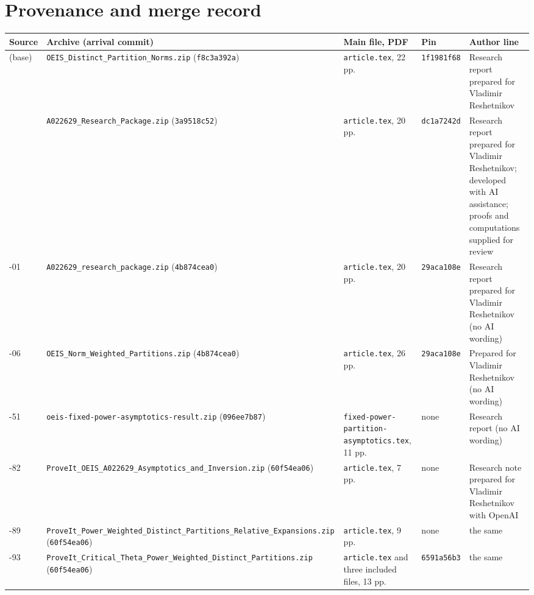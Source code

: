 \documentclass[11pt]{article}
\numberwithin{equation}{section}
\theoremstyle{definition}\newtheorem{definition}[theorem]{Definition}
\theoremstyle{remark}\newtheorem{remark}[theorem]{Remark}
\newcommand{\file}[1]{\nolinkurl{#1}}
\begin{document}
\section{Provenance and merge record}\label{dpn:app:prov}
\begin{center}
\small
\begin{tabular}{>{\raggedright\arraybackslash}p{1.2cm}>{\raggedright\arraybackslash}p{4.0cm}>{\raggedright\arraybackslash}p{2.8cm}>{\raggedright\arraybackslash}p{1.8cm}>{\raggedright\arraybackslash}p{3.2cm}}
\toprule
Source & Archive (arrival commit) & Main file, PDF & Pin & Author line\\
\midrule
40 (base) & \file{OEIS_Distinct_Partition_Norms.zip} (\texttt{f8c3a392a}) &
  \file{article.tex}, 22 pp. & \texttt{1f1981f68} & Research report prepared
  for Vladimir Reshetnikov\\
48 & \file{A022629_Research_Package.zip} (\texttt{3a9518c52}) &
  \file{article.tex}, 20 pp. & \texttt{dc1a7242d} & Research report prepared
  for Vladimir Reshetnikov; developed with AI assistance; proofs and
  computations supplied for review\\
75-01 & \file{A022629_research_package.zip} (\texttt{4b874cea0}) &
  \file{article.tex}, 20 pp. & \texttt{29aca108e} & Research report prepared
  for Vladimir Reshetnikov (no AI wording)\\
75-06 & \file{OEIS_Norm_Weighted_Partitions.zip} (\texttt{4b874cea0}) &
  \file{article.tex}, 26 pp. & \texttt{29aca108e} & Prepared for Vladimir
  Reshetnikov (no AI wording)\\
77-51 & \file{oeis-fixed-power-asymptotics-result.zip} (\texttt{096ee7b87}) &
  \file{fixed-power-partition-asymptotics.tex}, 11 pp. & none & Research
  report (no AI wording)\\
100-82 & \file{ProveIt_OEIS_A022629_Asymptotics_and_Inversion.zip}
  (\texttt{60f54ea06}) & \file{article.tex}, 7 pp. & none & Research note
  prepared for Vladimir Reshetnikov with OpenAI\\
100-89 & \file{ProveIt_Power_Weighted_Distinct_Partitions_Relative_Expansions.zip}
  (\texttt{60f54ea06}) & \file{article.tex}, 9 pp. & none & the same\\
100-93 & \file{ProveIt_Critical_Theta_Power_Weighted_Distinct_Partitions.zip}
  (\texttt{60f54ea06}) & \file{article.tex} and three included files, 13 pp. &
  \texttt{6591a56b3} & the same\\
\bottomrule
\end{tabular}
\end{center}
\end{document}
